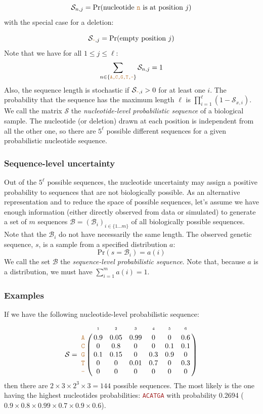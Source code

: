 \documentclass[10pt]{article}
\newcommand{\sq}[1]{\texttt{\textcolor{brown}{#1}}}
\newcommand{\pr}[1]{\mathrm{Pr}(#1)}
\newcommand{\sps}{\mathcal{B}} %
\newcommand{\nps}{\mathcal{S}} %
\newcommand{\nlps}{nucleotide-level probabilistic sequence\xspace}
\newcommand{\slps}{sequence-level probabilistic sequence\xspace}
\begin{document}
\begin{equation}
\nps_{n,j} = \pr{\text{nucleotide \sq{n} is at position }j}
\end{equation}
with the special case for a deletion:

\begin{equation}
\nps_{\sq{-},j} = \pr{\text{empty position }j}
\end{equation}
Note that we have for all $1\leq j \leq \ell$:
\begin{equation}
\sum_{n\in \{ \sq{A,C,G,T,-} \} } \nps_{n, j} = 1
\end{equation}
Also, the sequence length is stochastic if $\nps_{\sq{-},i}>0$ for at least one $i$. The probability that the sequence has the maximum length $\ell$ is $\prod_{i=1}^\ell (1-\nps_{x,i})$. 
We call the matrix $\nps$ the \emph{\nlps} of a biological sample.
The nucleotide (or deletion) drawn at each position is independent from all the other one, so there are $5^\ell$ possible different sequences for a given probabilistic nucleotide sequence. 



\subsubsection{Sequence-level uncertainty}

Out of the $5^\ell$ possible sequences, the nucleotide uncertainty may assign a positive probability to sequences that are not biologically possible.
As an alternative representation and to reduce the space of possible sequences, let's assume we have enough information (either directly observed from data or simulated) to generate a set of $m$ sequences $\sps = (\sps_i)_{i\in\{1\ldots m\} }$ of all biologically possible sequences. Note that the $\sps_i$ do not have necessarily the same length. 
The observed genetic sequence, $s$, is a sample from a specified distribution $a$:
\begin{equation}
\pr{s = \sps_i} = a(i)
\end{equation}
We call the set $\sps$ the \emph{\slps}. Note that, because $a$ is a distribution, we must have $\sum_{i=1}^m a(i) = 1$. 




\subsubsection{Examples}

If we have the following \nlps:
$$
\nps = 
\bordermatrix{
& \scriptscriptstyle{1} & \scriptscriptstyle{2}& \scriptscriptstyle{3}& \scriptscriptstyle{4} & \scriptscriptstyle{5} & \scriptscriptstyle{6} \cr
\sq{A} & 0.9 & 0.05   & 0.99 & 0 & 0 & 0.6\cr
\sq{C} & 0   & 0.8 & 0 & 0 & 0.1 & 0.1\cr
\sq{G} & 0.1 & 0.15 & 0 & 0.3 & 0.9 & 0\cr
\sq{T} & 0 & 0 & 0.01 & 0.7 & 0 & 0.3\cr
\sq{-} & 0 & 0 & 0 & 0 & 0 & 0\cr
}
$$
then there are $2\times 3 \times 2^3 \times 3 = 144$ possible sequences. The most likely is the one having the highest nucleotides probabilities: \sq{ACATGA} with probability 0.2694  ($0.9\times 0.8\times 0.99 \times 0.7 \times 0.9 \times 0.6$).
\end{document}
